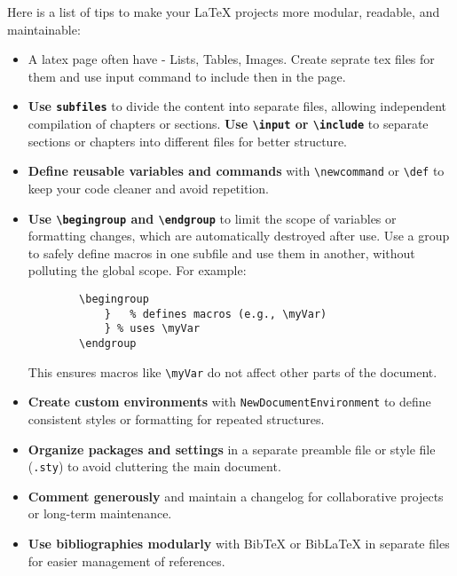 \documentclass[../../main.tex]{subfiles}
\begin{document}
Here is a list of tips to make your LaTeX projects more modular, readable, and maintainable:

\begin{itemize}
    \item A latex page often have - Lists, Tables, Images. Create seprate tex files for them and use input command to include then in the page.

    \item \textbf{Use \texttt{subfiles}} to divide the content into separate files, allowing independent compilation of chapters or sections. \textbf{Use \texttt{\textbackslash input} or \texttt{\textbackslash include}} to separate sections or chapters into different files for better structure.
        
    \item \textbf{Define reusable variables and commands} with \texttt{\textbackslash newcommand} or \texttt{\textbackslash def} to keep your code cleaner and avoid repetition.
    
    \item \textbf{Use \texttt{\textbackslash begingroup} and \texttt{\textbackslash endgroup}} to limit the scope of variables or formatting changes, which are automatically destroyed after use. Use a group to safely define macros in one subfile and use them in another, without polluting the global scope. For example:
    \begin{verbatim}
        \begingroup
            }   % defines macros (e.g., \myVar)
            } % uses \myVar
        \endgroup
    \end{verbatim}
    This ensures macros like \texttt{\textbackslash myVar} do not affect other parts of the document.

    
    \item \textbf{Create custom environments} with \texttt{NewDocumentEnvironment} to define consistent styles or formatting for repeated structures. 

    
    \item \textbf{Organize packages and settings} in a separate preamble file or style file (\texttt{.sty}) to avoid cluttering the main document.
    
    \item \textbf{Comment generously} and maintain a changelog for collaborative projects or long-term maintenance.
    
    \item \textbf{Use bibliographies modularly} with BibTeX or BibLaTeX in separate files for easier management of references.
    

\end{itemize}
\end{document}
